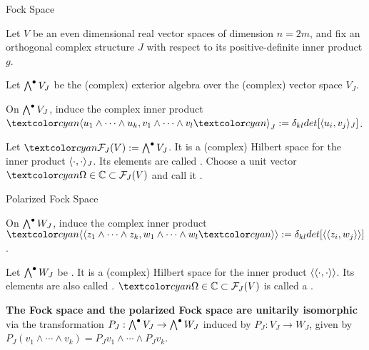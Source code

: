 \begin{frame}{Fock Space} %

    Let $V$ be an even dimensional real vector spaces of dimension $n = 2m$, and fix an orthogonal complex structure $J$ with respect to its positive-definite inner product $g$.
    
    Let $\bigwedge^\bullet V_J$ be the (complex) exterior algebra over the (complex) vector space $V_J$.
    
    On $\bigwedge^\bullet V_J$, induce the complex inner product $\defn{\bra} u_1 \wedge \cdots \wedge u_k, v_1 \wedge \cdots \wedge v_l \defn{\ket}_J := \delta_{kl} det[\bra u_i, v_j \ket_J]$.
    
    \begin{definition}
    Let  $\defn{\mathcal F_J(V)} := \extv_J$. It is a (complex) Hilbert space for the inner product $\langle \cdot, \cdot \rangle_J$. Its elements are called . Choose a unit vector $\defn{\Omega} \in \CC \subset \fjv$ and call it .
    \end{definition}

\end{frame}

\begin{frame}{Polarized Fock Space} %

    On $\bigwedge^\bullet W_J$, induce the complex inner product $\defn{\bbra} z_1 \wedge \cdots \wedge z_k, w_1 \wedge \cdots \wedge w_l \defn{\kket} := \delta_{kl} det[\bbra z_i, w_j \kket]$.
    
    \begin{definition}
    Let $\bigwedge^\bullet W_J$ be . It is a (complex) Hilbert space for the inner product $\langle\langle \cdot, \cdot \rangle\rangle$. Its elements are also called . $\defn{\Omega} \in \CC \subset \fjv$ is called a .
    \end{definition}
    
    \textbf{The Fock space and the polarized Fock space are unitarily isomorphic} via the transformation $P_J : \bigwedge^\bullet V_J \to \bigwedge^\bullet W_J$ induced by $P_J:V_J \to W_J$, given by $P_J(v_1 \wedge \cdots \wedge v_k) = P_Jv_1 \wedge \cdots \wedge P_Jv_k$.
    
\end{frame}

